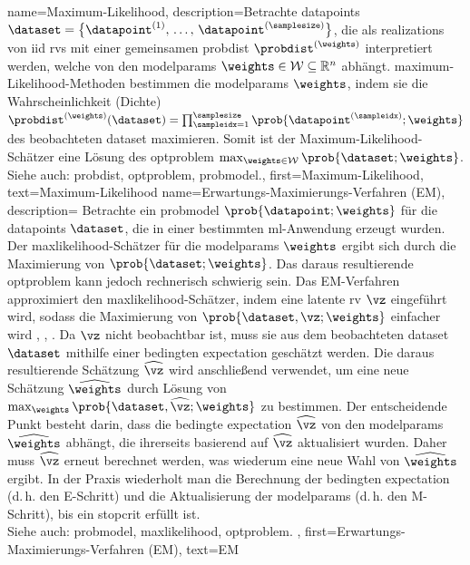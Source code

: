 {{{{
{
    name={Maximum-Likelihood}, 
    description={Betrachte \glspl{datapoint} 
        $\dataset=\big\{ \datapoint^{(1)}, \,\ldots, \,\datapoint^{(\samplesize)} \big\}$, 
        die als \glspl{realization} von \gls{iid} \glspl{rv} mit einer gemeinsamen 
        \gls{probdist} $\probdist^{(\weights)}$ interpretiert werden, 
        welche von den \glspl{modelparam} $\weights \in \mathcal{W} \subseteq \mathbb{R}^{n}$ abhängt.  
        \Gls{maximum}-Likelihood-Methoden bestimmen die \glspl{modelparam} $\weights$, 
        indem sie die Wahrscheinlichkeit (Dichte) 
        $\probdist^{(\weights)}(\dataset) 
        = \prod_{\sampleidx=1}^{\samplesize} \prob{\datapoint^{(\sampleidx)}; \weights}$ 
        des beobachteten \gls{dataset} maximieren. 
        Somit ist der Maximum-Likelihood-Schätzer eine Lösung des 
        \gls{optproblem} 
        $\max_{\weights \in \mathcal{W}} \prob{\dataset; \weights}$. 
        \\
        Siehe auch: \gls{probdist}, \gls{optproblem}, \gls{probmodel}.},
    first={Maximum-Likelihood},
    text={Maximum-Likelihood}
}
{
    name={Erwartungs-Maximierungs-Verfahren (EM)}, 
    description={ 
        Betrachte ein \gls{probmodel} $\prob{\datapoint; \weights}$ für die \glspl{datapoint} 
        $\dataset$, die in einer bestimmten \gls{ml}-Anwendung erzeugt wurden. 
        Der \gls{maxlikelihood}-Schätzer für die \glspl{modelparam} $\weights$ ergibt sich durch 
        die Maximierung von $\prob{\dataset; \weights}$. 
        Das daraus resultierende \gls{optproblem} kann jedoch rechnerisch schwierig sein.  
        Das EM-Verfahren approximiert den \gls{maxlikelihood}-Schätzer, indem eine latente 
        \gls{rv} $\vz$ eingeführt wird, sodass die Maximierung von 
        $\prob{\dataset,\vz; \weights}$ einfacher wird 
        \cite{hastie01statisticallearning}, \cite{BishopBook}, \cite{GraphModExpFamVarInfWainJor}.  
        Da $\vz$ nicht beobachtbar ist, muss sie aus dem beobachteten \gls{dataset} $\dataset$ 
        mithilfe einer bedingten \gls{expectation} geschätzt werden. 
        Die daraus resultierende Schätzung $\widehat{\vz}$ wird anschließend verwendet, 
        um eine neue Schätzung $\widehat{\weights}$ durch Lösung von 
        $\max_{\weights} \prob{\dataset, \widehat{\vz}; \weights}$ zu bestimmen.  
        Der entscheidende Punkt besteht darin, dass die bedingte \gls{expectation} $\widehat{\vz}$ 
        von den \glspl{modelparam} $\widehat{\weights}$ abhängt, 
        die ihrerseits basierend auf $\widehat{\vz}$ aktualisiert wurden.  
        Daher muss $\widehat{\vz}$ erneut berechnet werden, was wiederum eine neue Wahl von 
        $\widehat{\weights}$ ergibt.  
        In der Praxis wiederholt man die Berechnung der bedingten \gls{expectation} 
        (d.\,h. den E-Schritt) und die Aktualisierung der \glspl{modelparam} 
        (d.\,h. den M-Schritt), bis ein \gls{stopcrit} erfüllt ist.  
        \\
        Siehe auch: \gls{probmodel}, \gls{maxlikelihood}, \gls{optproblem}. },
    first={Erwartungs-Maximierungs-Verfahren (EM)},
    text={EM}
}

}}}}
